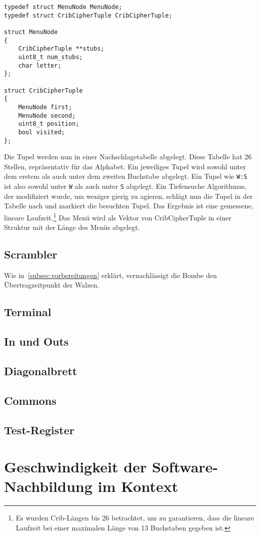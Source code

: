 
\noindent
\begin{lstlisting}[style=mystyle]
typedef struct MenuNode MenuNode;
typedef struct CribCipherTuple CribCipherTuple;

struct MenuNode
{
	CribCipherTuple **stubs;
	uint8_t num_stubs;
	char letter;
};

struct CribCipherTuple
{
	MenuNode first;
	MenuNode second;
	uint8_t position;
	bool visited;
};
\end{lstlisting}

Die Tupel werden nun in einer \glqq Nachschlagetabelle\grqq{} abgelegt.
Diese Tabelle hat 26 Stellen, repräsentativ für das Alphabet.
Ein jeweiliges Tupel wird sowohl unter dem erstem als auch unter dem zweiten Buchstabe abgelegt. 
Ein Tupel wie \texttt{W:S} ist also sowohl unter \texttt{W} als auch unter \texttt{S} abgelegt.
Ein Tiefensuche Algorithmus, der modifiziert wurde, um weniger \glqq gierig\grqq{} zu agieren, schlägt nun die Tupel in der Tabelle nach und markiert die besuchten Tupel.
Das Ergebnis ist eine gemessene, lineare Laufzeit.\footnote{Es wurden Crib-Längen bis 26 betrachtet, um zu garantieren, dass die lineare Laufzeit bei einer maximalen Länge von 13 Buchstaben gegeben ist.} 
Das Menü wird als Vektor von \glqq CribCipherTuple\grqq{} in einer Struktur mit der Länge des Menüs abgelegt.

\section{Scrambler}\label{sec:impl_scrambler}
Wie in~\cref{subsec:vorbereitungen} erklärt, vernachlässigt die Bombe den Übertragzeitpunkt der Walzen.

\section{Terminal}\label{sec:impl_terminal}
\section{In und Outs}\label{sec:impl_in_und_outs}
\section{Diagonalbrett}\label{sec:impl_diagonal_board}
\section{Commons}\label{sec:impl_commons}
\section{Test-Register}\label{sec:impl_test-register}

\chapter{Geschwindigkeit der Software-Nachbildung im Kontext}